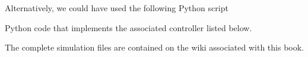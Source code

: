 % 
%  
%  
%
%  
%  


Alternatively, we could have used the following Python script
\ifsolutionmanual

\else

\fi

Python code that implements the associated controller listed below.
\ifsolutionmanual

\else

\fi


The complete simulation files are contained on the wiki associated with this book.

